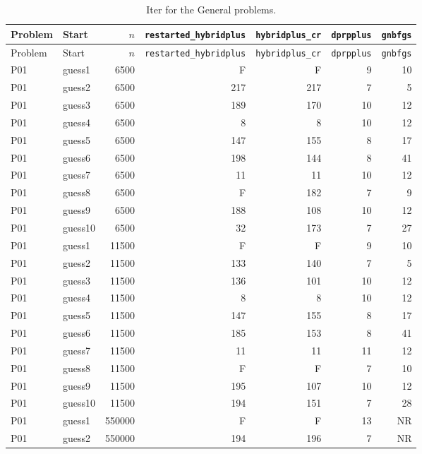{\footnotesize
\begin{longtable}{llrrrrr}
\caption{Iter for the General problems.}\label{tab:general_iterations}\\
\toprule Problem & Start & $n$ & \texttt{restarted\_hybridplus} & \texttt{hybridplus\_cr} & \texttt{dprpplus} & \texttt{gnbfgs} \\
\midrule
\endfirsthead
\toprule Problem & Start & $n$ & \texttt{restarted\_hybridplus} & \texttt{hybridplus\_cr} & \texttt{dprpplus} & \texttt{gnbfgs} \\
\midrule
\endhead
\bottomrule
\endfoot
P01 & guess1 & 6500 & F & F & 9 & 10 \\
P01 & guess2 & 6500 & 217 & 217 & 7 & 5 \\
P01 & guess3 & 6500 & 189 & 170 & 10 & 12 \\
P01 & guess4 & 6500 & 8 & 8 & 10 & 12 \\
P01 & guess5 & 6500 & 147 & 155 & 8 & 17 \\
P01 & guess6 & 6500 & 198 & 144 & 8 & 41 \\
P01 & guess7 & 6500 & 11 & 11 & 10 & 12 \\
P01 & guess8 & 6500 & F & 182 & 7 & 9 \\
P01 & guess9 & 6500 & 188 & 108 & 10 & 12 \\
P01 & guess10 & 6500 & 32 & 173 & 7 & 27 \\
P01 & guess1 & 11500 & F & F & 9 & 10 \\
P01 & guess2 & 11500 & 133 & 140 & 7 & 5 \\
P01 & guess3 & 11500 & 136 & 101 & 10 & 12 \\
P01 & guess4 & 11500 & 8 & 8 & 10 & 12 \\
P01 & guess5 & 11500 & 147 & 155 & 8 & 17 \\
P01 & guess6 & 11500 & 185 & 153 & 8 & 41 \\
P01 & guess7 & 11500 & 11 & 11 & 11 & 12 \\
P01 & guess8 & 11500 & F & F & 7 & 10 \\
P01 & guess9 & 11500 & 195 & 107 & 10 & 12 \\
P01 & guess10 & 11500 & 194 & 151 & 7 & 28 \\
P01 & guess1 & 550000 & F & F & 13 & NR \\
P01 & guess2 & 550000 & 194 & 196 & 7 & NR \\

\end{longtable}}
